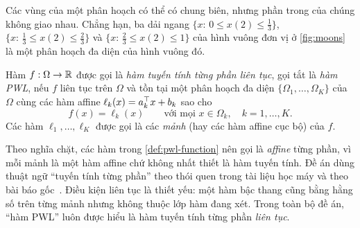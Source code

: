 Các vùng của một phân hoạch có thể có chung biên, nhưng phần trong của chúng không giao nhau. Chẳng hạn, ba dải ngang $\{x:\,0\le x(2)\le \tfrac13\}$, $\{x:\,\tfrac13\le x(2)\le\tfrac23\}$ và $\{x:\,\tfrac23\le x(2)\le 1\}$ của hình vuông đơn vị ở \cref{fig:moons} là một phân hoạch đa diện của hình vuông đó.

\begin{definition}\label{def:pwl-function}
Hàm $f:\Omega\to\mathbb{R}$ được gọi là \emph{hàm tuyến tính từng phần liên tục}, gọi tắt là \emph{hàm PWL}, nếu $f$ liên tục trên $\Omega$ và tồn tại một phân hoạch đa diện $\{\Omega_1,\dots,\Omega_K\}$ của $\Omega$ cùng các hàm affine $\ell_k(x)=a_k^\top x+b_k$ sao cho
\begin{equation}\label{eq:pwl-def}
f(x)=\ell_k(x)\qquad\text{với mọi } x\in\Omega_k,\quad k=1,\dots,K.
\end{equation}
Các hàm $\ell_1,\dots,\ell_K$ được gọi là các \emph{mảnh} (hay các hàm affine cục bộ) của $f$.
\end{definition}

\begin{remark}\label{rem:terminology}
Theo nghĩa chặt, các hàm trong \cref{def:pwl-function} nên gọi là \emph{affine} từng phần, vì mỗi mảnh là một hàm affine chứ không nhất thiết là hàm tuyến tính. Đề án dùng thuật ngữ “tuyến tính từng phần” theo thói quen trong tài liệu học máy và theo bài báo gốc~\cite{huang2013}. Điều kiện liên tục là thiết yếu: một hàm bậc thang cũng bằng hằng số trên từng mảnh nhưng không thuộc lớp hàm đang xét. Trong toàn bộ đề án, “hàm PWL” luôn được hiểu là hàm tuyến tính từng phần \emph{liên tục}.
\end{remark}

